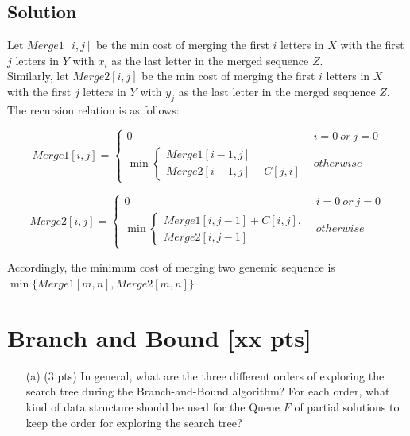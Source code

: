 \documentclass{article}
\begin{document}
\subsection*{Solution}
\color{blue}
Let $Merge1[i,j]$ be the min cost of merging the first $i$ letters in $X$ with the first $j$ letters in $Y$ with $x_i$ as the last letter in the merged sequence $Z$.\\
Similarly, let $Merge2[i,j]$ be the min cost of merging the first $i$ letters in $X$ with the first $j$ letters in $Y$ with $y_j$ as the last letter in the merged sequence $Z$. \\
The recursion relation is as follows:


$$
 Merge1[i,j] =
    \begin{cases}
      0 & i =0\ or\ j = 0\\
      \min 
      \begin{cases}
      	Merge1[i-1,j] \\
      	Merge2[i-1,j]+ C[j,i]
      \end{cases} 
       & otherwise
    \end{cases} 
$$

$$
 Merge2[i,j] =
    \begin{cases}
      0 & i =0\ or\ j = 0\\
      \min 
      \begin{cases}
      	Merge1[i,j-1]+ C[i,j], \\
      	Merge2[i,j-1]
      \end{cases} 
       & otherwise
    \end{cases} 
$$

Accordingly, the minimum cost of merging two genemic sequence is $\min\{Merge1[m,n],Merge2[m,n]\}$




\color{black}
\newpage
\section{Branch and Bound [xx pts]} 
\begin{itemize}
\item[(a)] (3 pts) In general, what are the three different orders of exploring the search tree during the Branch-and-Bound algorithm?  For each order, what kind of data structure should be used for the Queue $F$ of partial solutions to keep the order for exploring the search tree?
%
\end{itemize}
\end{document}
